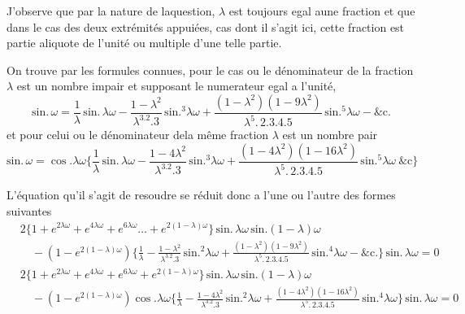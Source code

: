 \documentclass[11pt,a4paper]{article}
\begin{document}
J'observe que par la nature de laquestion, $\lambda$ est toujours egal aune
fraction et que dans le cas des deux extrémités appuiées, cas dont il s'agit
ici, cette fraction est partie aliquote de l'unité ou multiple d'une telle
 partie.

On trouve par les formules connues, pour le cas ou le dénominateur de la
fraction $\lambda$ est un nombre impair et supposant le numerateur egal a
l'unité,
\[ \text{sin.}\,\omega=\frac{1}{\lambda}\,\text{sin.}\,\lambda\omega-\frac{1-\lambda^2}{\lambda^3.2.3}\,\text{sin.}^3\lambda\omega+\frac{(1-\lambda^2)(1-9\lambda^2)}{\lambda^5.\,2.3.4.5}\,\text{sin.}^5\lambda\omega-\text{\&c.} \]
et pour celui ou le dénominateur dela même fraction $\lambda$ est un nombre
pair
\[ \text{sin.}\,\omega=\cos.\lambda\omega\Big\{\frac{1}{\lambda}\,\text{sin.}\,\lambda\omega-\frac{1-4\lambda^2}{\lambda^3.2.3}\,\text{sin.}^3\lambda\omega+\frac{(1-4\lambda^2)(1-16\lambda^2)}{\lambda^5.\,2.3.4.5}\,\text{sin.}^5\lambda\omega\ \text{\&c}\Big\} \]

L'équation qu'il s'agit de resoudre se réduit donc a l'une ou l'autre des
formes suivantes
\begin{align*}
&2\big\{1+e^{2\lambda\omega}+e^{4\lambda\omega}+e^{6\lambda\omega}\ldots+e^{2(1-\lambda)\omega}\big\}\,\text{sin.}\,\lambda\omega\,\text{sin.}(1-\lambda)\omega \\
&\quad -(1-e^{2(1-\lambda)\omega})\Big\{\frac{1}{\lambda}-\frac{1-\lambda^2}{\lambda^3.2.3}\,\text{sin.}^2\lambda\omega+\frac{(1-\lambda^2)(1-9\lambda^2)}{\lambda^5.\,2.3.4.5}\,\text{sin.}^4\lambda\omega-\text{\&c.}\Big\}\,\text{sin.}\,\lambda\omega=0
\end{align*}
\begin{align*}
&2\big\{1+e^{2\lambda\omega}+e^{4\lambda\omega}+e^{6\lambda\omega}+e^{2(1-\lambda)\omega}\big\}\,\text{sin.}\,\lambda\omega\,\text{sin.}(1-\lambda)\omega \\
&\quad -(1-e^{2(1-\lambda)\omega})\cos.\lambda\omega\Big\{\frac{1}{\lambda}-\frac{1-4\lambda^2}{\lambda^3.2.3}\,\text{sin.}^2\lambda\omega+\frac{(1-4\lambda^2)(1-16\lambda^2)}{\lambda^5.\,2.3.4.5}\,\text{sin.}^4\lambda\omega\Big\}\,\text{sin.}\,\lambda\omega=0
\end{align*}
\end{document}
